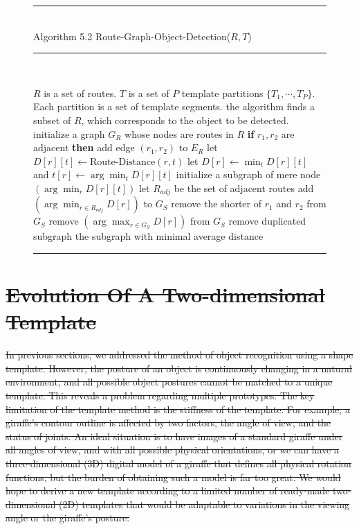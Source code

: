 \documentclass[journal]{IEEEtran}
\newenvironment{myalgorithm}[1]%
{\begin{figure}[!h]\small\noindent\rule{\linewidth}{1pt}\\#1\vspace{-0.5em}\\%
\rule{\linewidth}{0.5pt}\\\vspace{-1.5em}}%
{\vspace{-0.5em}\rule{\linewidth}{1pt}\end{figure}}
\providecommand{\DIFdel}[1]{{\protect\color{red}\sout{#1}}}                      %
\providecommand{\DIFdelbegin}{} %
\begin{document}
\begin{myalgorithm}{Algorithm 5.2 Route-Graph-Object-Detection($R,T$)}
\begin{algorithmic}[1]
\REQUIRE $R$ is a set of routes. $T$ is a set of $P$ template partitions
$\{T_1,\cdots,T_P\}$. Each partition is a set of template segments.
\ENSURE the algorithm finds a subset of $R$, which corresponds to the object to be detected.
\STATE initialize a graph $G_R$ whose nodes are routes in $R$
  \STATE \textbf{if} $r_1,r_2$ are adjacent \textbf{then} add edge $(r_1,r_2)$ to $E_R$
\ENDFOR
{}
    \STATE let $D[r][t]\leftarrow\text{Route-Distance}(r,t)$
  \ENDFOR
    \STATE let $D[r]\leftarrow\min_t D[r][t]$ and $t[r]\leftarrow\arg\min_t D[r][t]$
  \ENDFOR
    \STATE initialize a subgraph of mere node $(\arg\min_r D[r][t])$
  \ENDFOR
  \REPEAT
      \STATE let $R_{adj}$ be the set of adjacent routes
        \STATE add $(\arg\min_{r\in R_{adj}}D[r])$ to $G_S$
      \ENDIF
        \STATE remove the shorter of $r_1$ and $r_2$ from $G_S$
      \ENDIF
        \STATE remove $(\arg\max_{r\in G_S}D[r])$ from $G_S$
      \ENDIF
    \ENDFOR
    \STATE remove duplicated subgraph
\ENDFOR
\RETURN the subgraph with minimal average distance
\end{algorithmic}
\end{myalgorithm}

\DIFdelbegin \section{\DIFdel{Evolution Of A Two-dimensional Template}}
\addtocounter{section}{-1}%

\DIFdel{In previous sections, we addressed the method of object recognition using a shape template. 
However, the posture of an object is continuously changing in a natural environment, 
and all possible object postures cannot be matched to a unique template. 
This reveals a problem regarding multiple prototypes. 
The key limitation of the template method is the stiffness of the template. 
For example, a giraffe's contour outline is affected by two factors, 
the angle of view, and the status of joints. 
An ideal situation is to have images of a standard giraffe under all angles of view, 
and with all possible physical orientations, 
or we can have a three-dimensional (3D) digital model of a giraffe that defines all physical rotation functions, 
but the burden of obtaining such a model is far too great. 
We would hope to derive a new template according to a limited number of ready-made two-dimensional (2D) templates that would be adaptable to variations in the viewing angle or the giraffe's posture.
}%
\end{document}
